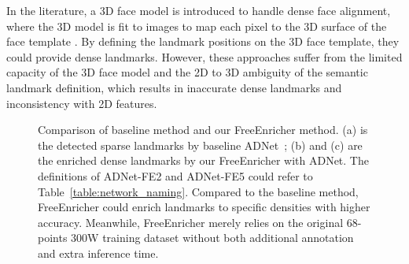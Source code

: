 \documentclass[letterpaper]{article} \usepackage{aaai23}  \usepackage{times}  \usepackage{helvet}  \usepackage{courier}  \usepackage[hyphens]{url}  \usepackage{graphicx} \urlstyle{rm} \def\UrlFont{\rm}  \usepackage{natbib}  \usepackage{caption} \frenchspacing  \setlength{\pdfpagewidth}{8.5in}  \setlength{\pdfpageheight}{11in}  \usepackage{algorithm}
\begin{document}
In the literature, a 3D face model is introduced to handle dense face alignment, where the 3D model is fit to images to map each pixel to the 3D surface of the face template \cite{zhu2016face,liu2017dense,liu2016joint,cootes1995active}. 
By defining the landmark positions on the 3D face template, they could provide dense landmarks. However, these approaches suffer from the limited capacity of the 3D face model and the 2D to 3D ambiguity of the semantic landmark definition, which results in inaccurate dense landmarks and inconsistency with 2D features.

\begin{figure}[t]
\small
\centering
	\centering
  \caption{
  Comparison of baseline method and our FreeEnricher method. 
  (a) is the detected sparse landmarks by baseline ADNet~\cite{huang2021adnet};
  (b) and (c) are the enriched dense landmarks by our FreeEnricher with ADNet. 
  The definitions of ADNet-FE2 and ADNet-FE5 could refer to Table~\ref{table:network_naming}. Compared to the baseline method, FreeEnricher could enrich landmarks to specific densities with higher accuracy.
  Meanwhile, FreeEnricher merely relies on the original 68-points 300W training dataset without both additional annotation and extra inference time.
}
\label{figure:sparse2dense}
\end{figure}
\end{document}
